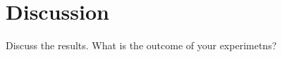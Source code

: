 \chapter{Discussion}\label{chap:discussion}


Discuss the results. What is the outcome of your experimetns?